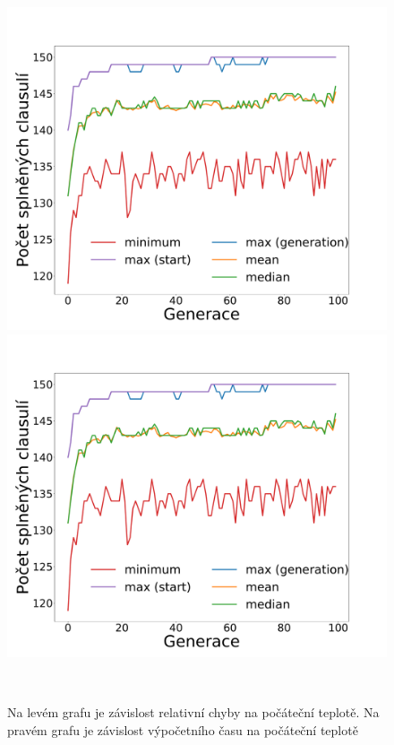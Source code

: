 \documentclass[11pt]{article}
\begin{document}
\begin{figure}
	\centering
    \begin{minipage}[c]{0.42\textwidth}
        \centering\includegraphics[width=\textwidth]{img/1c.pdf} 
    \end{minipage}
    \begin{minipage}[c]{0.42\textwidth}
        \centering \includegraphics[width=\textwidth]{img/1c.pdf} 
    \end{minipage}
    \\
   \caption{Na levém grafu je závislost relativní chyby na počáteční teplotě. Na pravém grafu je závislost výpočetního času na počáteční teplotě}\label{fig:GZNT}
\end{figure} 
\end{document}
